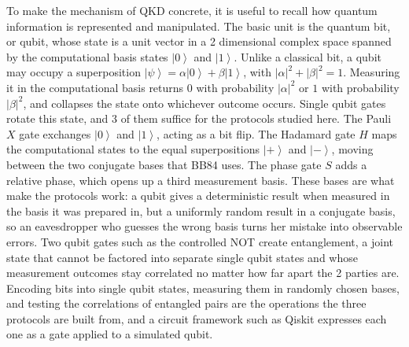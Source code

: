\documentclass[conference]{IEEEtran}
\newcommand{\ket}[1]{\left|#1\right\rangle}
\begin{document}
To make the mechanism of QKD concrete, it is useful to recall how quantum
information is represented and manipulated. The basic unit is the quantum bit,
or qubit, whose state is a unit vector in a 2 dimensional complex space
spanned by the computational basis states $\ket{0}$ and $\ket{1}$. Unlike a
classical bit, a qubit may occupy a superposition $\ket{\psi} = \alpha \ket{0} +
\beta \ket{1}$, with $|\alpha|^2 + |\beta|^2 = 1$. Measuring it in the
computational basis returns $0$ with probability $|\alpha|^2$ or $1$ with
probability $|\beta|^2$, and collapses the state onto whichever outcome occurs.
Single qubit gates rotate this state, and 3 of them suffice for the
protocols studied here. The Pauli $X$ gate exchanges $\ket{0}$ and $\ket{1}$,
acting as a bit flip. The Hadamard gate $H$ maps the computational states to the
equal superpositions $\ket{+}$ and $\ket{-}$, moving between the two conjugate
bases that BB84 uses. The phase gate $S$ adds a relative phase, which opens up a
third measurement basis. These bases are what make the protocols work: a qubit
gives a deterministic result when measured in the basis it was prepared in, but
a uniformly random result in a conjugate basis, so an eavesdropper who guesses
the wrong basis turns her mistake into observable errors. Two qubit gates such
as the controlled NOT create entanglement, a joint state that cannot be factored
into separate single qubit states and whose measurement outcomes stay correlated
no matter how far apart the 2 parties are. Encoding bits into single qubit
states, measuring them in randomly chosen bases, and testing the correlations of
entangled pairs are the operations the three protocols are built from, and a
circuit framework such as Qiskit expresses each one as a gate applied to a
simulated qubit.
\end{document}
